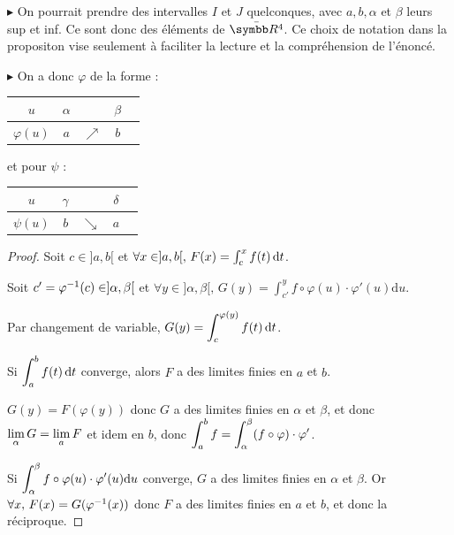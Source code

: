 \begin{remarque}
    $\blacktriangleright$ On pourrait prendre des intervalles $I$ et $J$ quelconques, 
    avec $a, b, \alpha$ et $\beta$ leurs sup et inf. Ce sont donc des éléments de $\bar{\R^4}$.
    Ce choix de notation dans la propositon vise seulement à faciliter la lecture et la compréhension de l'énoncé.

    \avspace $\blacktriangleright$ On a donc $\varphi$ de la forme :  
    \begin{center}
        \begin{tabular}{c|c c c c}
            $u$ & $\alpha$ &  & $\beta$ \\
            \hline
            $\varphi(u)$ & $a$ & $\nearrow$ &$b$ \\
        \end{tabular}
    \end{center}

    et pour $\psi$ :
    \begin{center}
        \begin{tabular}{c|c c c c}
            $u$ & $\gamma$ &  & $\delta$ \\
            \hline
            $\psi(u)$ & $b$ & $\searrow$ &$a$ \\
        \end{tabular}
    \end{center}
\end{remarque}


\begin{proof}
    Soit $c \in ]a, b[$ et $\forall x \in ]a, b[, \, F(x) = \int_c^x f(t) \,\mathrm{d}t$.

    Soit $c' = \varphi ^{-1} (c) \in ]\alpha, \beta[$ et 
    $\forall y \in ] \alpha, \beta[, \, G(y) = \int_{c'}^y f \circ \varphi(u) \cdot \varphi'(u) \mathrm d u$.

    Par changement de variable, $G(y) = \displaystyle \int_c^{\varphi(y)} f(t) \,\mathrm{d}t$. 

    Si $\displaystyle \int_{a }^{b } f(t) \,\mathrm{d}t$ converge, alors $F$ a des limites finies en $a$ et $b$.

    $G(y) = F(\varphi(y))$ donc $G$ a des limites finies en $\alpha$ et $\beta$, et donc 
    $\displaystyle \lim_\alpha G = \lim_a F$ et idem en $b$, donc 
    $\displaystyle \int_{a }^{b } f = \int_\alpha^\beta (f \circ \varphi) \cdot \varphi'$.

    Si $\displaystyle \int_{\alpha }^{\beta } f \circ \varphi(u) \cdot \varphi'(u) \mathrm d u$ converge,
    $G$ a des limites finies en $\alpha$ et $\beta$. Or $\forall x, \, F(x) = G(\varphi ^{-1} (x))$ donc $F$ a des limites finies en $a$ et $b$, et
    donc la réciproque. 
\end{proof}


